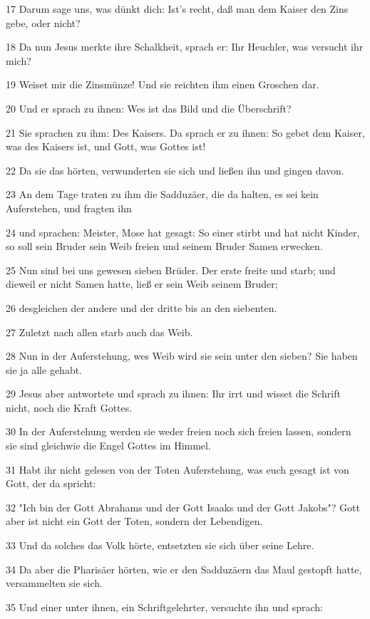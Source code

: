 \par 17 Darum sage uns, was dünkt dich: Ist's recht, daß man dem Kaiser den Zins gebe, oder nicht?
\par 18 Da nun Jesus merkte ihre Schalkheit, sprach er: Ihr Heuchler, was versucht ihr mich?
\par 19 Weiset mir die Zinsmünze! Und sie reichten ihm einen Groschen dar.
\par 20 Und er sprach zu ihnen: Wes ist das Bild und die Überschrift?
\par 21 Sie sprachen zu ihm: Des Kaisers. Da sprach er zu ihnen: So gebet dem Kaiser, was des Kaisers ist, und Gott, was Gottes ist!
\par 22 Da sie das hörten, verwunderten sie sich und ließen ihn und gingen davon.
\par 23 An dem Tage traten zu ihm die Sadduzäer, die da halten, es sei kein Auferstehen, und fragten ihn
\par 24 und sprachen: Meister, Mose hat gesagt: So einer stirbt und hat nicht Kinder, so soll sein Bruder sein Weib freien und seinem Bruder Samen erwecken.
\par 25 Nun sind bei uns gewesen sieben Brüder. Der erste freite und starb; und dieweil er nicht Samen hatte, ließ er sein Weib seinem Bruder;
\par 26 desgleichen der andere und der dritte bis an den siebenten.
\par 27 Zuletzt nach allen starb auch das Weib.
\par 28 Nun in der Auferstehung, wes Weib wird sie sein unter den sieben? Sie haben sie ja alle gehabt.
\par 29 Jesus aber antwortete und sprach zu ihnen: Ihr irrt und wisset die Schrift nicht, noch die Kraft Gottes.
\par 30 In der Auferstehung werden sie weder freien noch sich freien lassen, sondern sie sind gleichwie die Engel Gottes im Himmel.
\par 31 Habt ihr nicht gelesen von der Toten Auferstehung, was euch gesagt ist von Gott, der da spricht:
\par 32 "Ich bin der Gott Abrahams und der Gott Isaaks und der Gott Jakobs"? Gott aber ist nicht ein Gott der Toten, sondern der Lebendigen.
\par 33 Und da solches das Volk hörte, entsetzten sie sich über seine Lehre.
\par 34 Da aber die Pharisäer hörten, wie er den Sadduzäern das Maul gestopft hatte, versammelten sie sich.
\par 35 Und einer unter ihnen, ein Schriftgelehrter, versuchte ihn und sprach:
